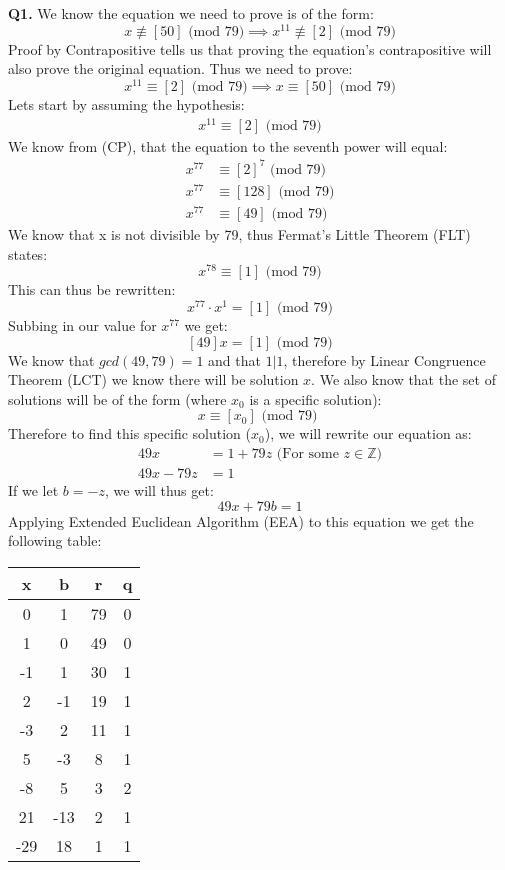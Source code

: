 \documentclass[11pt]{article}
\begin{document}
\parindent=0pt

\textbf{Q1.} We know the equation we need to prove is of the form:
\[ x \not\equiv [50] \text{ (mod 79)} \implies x^{11} \not\equiv [2] \text{ (mod 79)} \]
Proof by Contrapositive tells us that proving the equation's contrapositive will also prove the original equation. Thus we need to prove:
\[ x^{11} \equiv [2] \text{ (mod 79)}  \implies x \equiv [50] \text{ (mod 79)} \]
Lets start by assuming the hypothesis:
\begin{align*}
 x^{11} \equiv [2] \text{ (mod 79)} 
\end{align*}
We know from (CP), that the equation to the seventh power will equal:
\begin{align*}
 x^{77} &\equiv [2]^7 \text{ (mod 79)} \\
 x^{77} &\equiv [128] \text{ (mod 79)} \\
 x^{77} &\equiv [49] \text{ (mod 79)} 
\end{align*}
We know that x is not divisible by 79, thus Fermat's Little Theorem (FLT) states: 
\[ x^{78} \equiv [1] \text{ (mod 79)} \] 
This can thus be rewritten:
\[ x^{77}\cdot x^1 = [1] \text{ (mod 79)} \]
Subbing in our value for $x^{77}$ we get:
\[ [49]x = [1] \text{ (mod 79)} \]
We know that $gcd(49,79) = 1$ and that $1|1$, therefore by Linear Congruence Theorem (LCT) we know there will be solution $x$. We also know that the set of solutions will be of the form (where $x_0$ is a specific solution):
\[ x \equiv [x_0] \text{ (mod 79) } \]
Therefore to find this specific solution ($x_0$), we will rewrite our equation as: 
\begin{align*}
 49x & = 1 + 79z \text{ (For some $z \in \mathbb{Z}$)}  \\
 49x - 79z  &= 1 
\end{align*}
If we let $b = -z$, we will thus get:
\[  49x + 79b  = 1 \]
Applying Extended Euclidean Algorithm (EEA) to this equation we get the following table:
\begin{center}
 \begin{tabular}{||c c c c||} 
 \hline
 x & b & r & q \\ [0.5ex] 
 \hline\hline
 0 & 1 & 79 & 0 \\ 
 \hline
 1 & 0 & 49 & 0 \\
 \hline
 -1 & 1 & 30 & 1 \\
 \hline
 2 & -1 & 19 & 1\\
 \hline
 -3 & 2 & 11 & 1\\ 
 \hline
 5 & -3  & 8 & 1 \\
 \hline
 -8 & 5 & 3 & 2 \\ 
 \hline
21 & -13 & 2 & 1\\ 
 \hline
-29 & 18 & 1 & 1\\ 
 \hline
\end{tabular}
\end{center}
\end{document}
